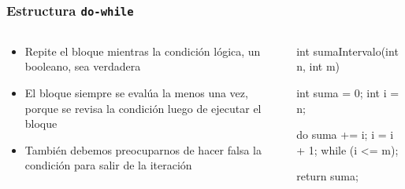 \documentclass{beamer}
\newcommand{\codet}[1]{\texttt{#1}}
\begin{document}
\begin{frame}[fragile]
  \frametitle{Estructura \codet{do-while}}

    \begin{columns}
    \begin{column}{0.4\textwidth}
      \begin{itemize}
        
      \item Repite el bloque mientras la condición lógica, un
        booleano, sea verdadera
        
      \item El bloque siempre se evalúa la menos una vez, porque se
        revisa la condición luego de ejecutar el bloque
        
      \item También debemos preocuparnos de hacer falsa la condición
        para salir de la iteración

      \end{itemize}      
    \end{column}
    \begin{column}{0.6\textwidth}
      \begin{jsmall}
        int sumaIntervalo(int n, int m) {
          int suma = 0;
          int i = n;

          do {
            suma += i;
            i = i + 1;
          } while (i <= m);          

          return suma;
        }
      \end{jsmall}
    \end{column}
  \end{columns}
\end{frame}
\end{document}
